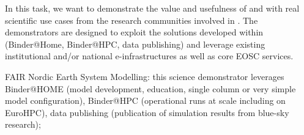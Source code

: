 \begin{task}[
  title=Science demonstrators,
  id=demos,
  lead=SRL,
  PM=1,
  wphases={0-36},
  partners={UIO}
]

  In this task, we want to demonstrate the value and usefulness of  and
   with real scientific use cases from the research communities involved in \TheProject.
  The demonstrators are designed to exploit the solutions developed within \TheProject (Binder@Home, Binder@HPC, data publishing)
  and leverage existing institutional and/or national e-infrastructures as well as core EOSC services. 

  \begin{compactitem}
  \item FAIR Nordic Earth System Modelling: this science demonstrator leverages Binder@HOME (model development, education, single column or very simple model configuration), Binder@HPC (operational runs at scale including on EuroHPC), data publishing (publication of simulation results from blue-sky research);
  \end{compactitem}
\end{task}
